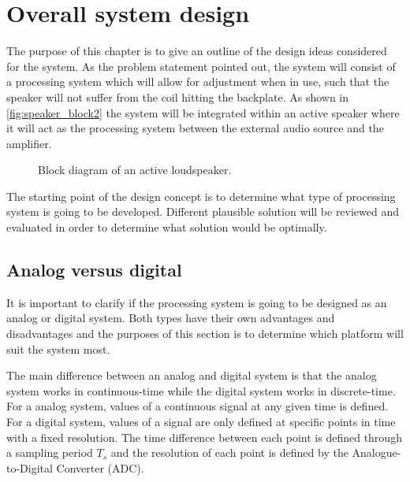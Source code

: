 \chapter{Overall system design}
The purpose of this chapter is to give an outline of the design ideas considered for the system. As the problem statement pointed out, the system will consist of a processing system which will allow for adjustment when in use, such that the speaker will not suffer from the coil hitting the backplate. As shown in \autoref{fig:speaker_block2} the system will be integrated within an active speaker where it will act as the processing system between the external audio source and the amplifier.

\begin{figure}[H]
	\centering
	\scalebox{0.9}{
		}
	\caption{Block diagram of an active loudspeaker.}
	\label{fig:speaker_block2}
\end{figure}



The starting point of the design concept is to determine what type of processing system is going to be developed. Different plausible solution will be reviewed and evaluated in order to determine what solution would be optimally. 


\section{Analog versus digital}
It is important to clarify if the processing system is going to be designed as an analog or digital system. Both types have their own advantages and disadvantages and the purposes of this section is to determine which platform will suit the system most. 

The main difference between an analog and digital system is that the analog system works in continuous-time while the digital system works in discrete-time. For a analog system, values of a continuous signal at any given time is defined. For a digital system, values of a signal are only defined at specific points in time with a fixed resolution. The time difference between each point is defined through a sampling period $T_s$ and the resolution of each point is defined by the Analogue-to-Digital Converter (ADC).

